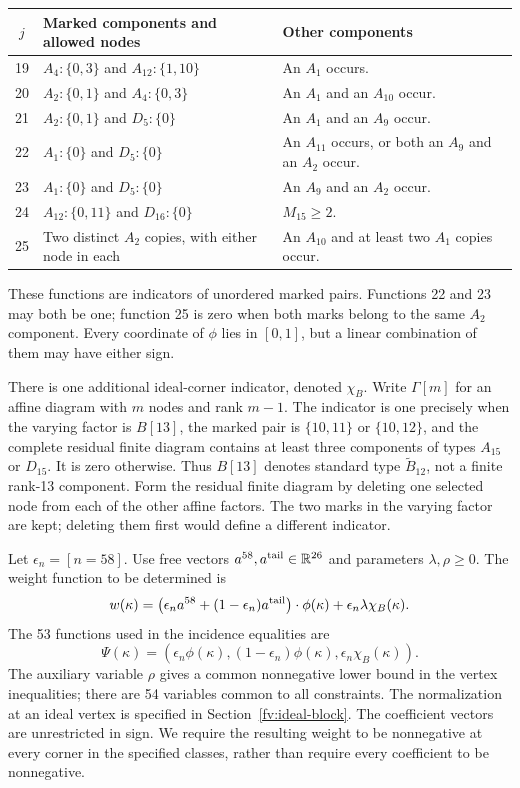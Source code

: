 \documentclass[11pt]{article}
\theoremstyle{definition}
\theoremstyle{remark}
\numberwithin{equation}{section}
\newcommand{\R}{\mathbb R}
\begin{document}
\begin{center}\small
\begin{tabular}{cp{}p{}}
\toprule
$j$&Marked components and allowed nodes&Other components\\\midrule
19&$A_4:\{0,3\}$ and $A_{12}:\{1,10\}$&An $A_1$ occurs.\\
20&$A_2:\{0,1\}$ and $A_4:\{0,3\}$&An $A_1$ and an $A_{10}$ occur.\\
21&$A_2:\{0,1\}$ and $D_5:\{0\}$&An $A_1$ and an $A_9$ occur.\\
22&$A_1:\{0\}$ and $D_5:\{0\}$&An $A_{11}$ occurs, or both an $A_9$ and an $A_2$ occur.\\
23&$A_1:\{0\}$ and $D_5:\{0\}$&An $A_9$ and an $A_2$ occur.\\
24&$A_{12}:\{0,11\}$ and $D_{16}:\{0\}$&$M_{15}\ge2$.\\
25&Two distinct $A_2$ copies, with either node in each&An $A_{10}$ and at least two $A_1$ copies occur.\\
\bottomrule
\end{tabular}
\end{center}
These functions are indicators of unordered marked pairs. Functions
22 and 23 may both be one; function 25 is zero when both marks belong
to the same $A_2$ component. Every coordinate of $\phi$ lies in
$[0,1]$, but a linear combination of them may have either sign.

There is one additional ideal-corner indicator, denoted $\chi_B$.
Write $\Gamma[m]$ for an affine diagram with $m$ nodes and rank $m-1$.
The indicator is one precisely when the varying factor is $B[13]$,
the marked pair is $\{10,11\}$ or $\{10,12\}$, and the complete
residual finite diagram contains at least three components of types
$A_{15}$ or $D_{15}$. It is zero otherwise. Thus $B[13]$ denotes
standard type $\widetilde B_{12}$, not a finite rank-13 component.
Form the residual finite diagram by deleting one selected node from
each of the other affine factors. The two marks in the varying factor
are kept; deleting them first would define a different indicator.

Let $\epsilon_n=[n=58]$. Use free vectors
$a^{58},a^{\rm tail}\in\R^{26}$ and parameters $\lambda,\rho\ge0$.
The weight function to be determined is
\begin{equation}\label{fv:piecewise-charge}
 w(\kappa)=
 \bigl(\epsilon_na^{58}+(1-\epsilon_n)a^{\rm tail}\bigr)
       \cdot\phi(\kappa)+\epsilon_n\lambda\chi_B(\kappa).
\end{equation}
The 53 functions used in the incidence equalities are
\begin{equation}\label{fv:conserved-features}
 \Psi(\kappa)=
 (\epsilon_n\phi(\kappa),(1-\epsilon_n)\phi(\kappa),
                     \epsilon_n\chi_B(\kappa)).
\end{equation}
The auxiliary variable $\rho$ gives a common nonnegative lower
bound in the vertex inequalities; there are 54 variables common to
all constraints. The normalization at an ideal vertex is specified
in Section~\ref{fv:ideal-block}. The coefficient vectors are
unrestricted in sign. We require the resulting weight to be
nonnegative at every corner in the specified classes, rather than
require every coefficient to be nonnegative.
\end{document}
